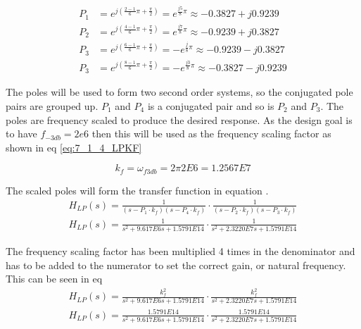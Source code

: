 \begin{equation}\label{eq:7_1_4_LPPoles1} 
    \begin{aligned}
        P_1 &= e^{j\left(\frac{2-1}{6}\pi + \frac{\pi}{2}\right)} = e^{\frac{j5}{8}\pi} \approx -0.3827 + j0.9239 \\
        P_2 &= e^{j\left(\frac{4-1}{6}\pi + \frac{\pi}{2}\right)} = e^{\frac{j7}{8}\pi} \approx -0.9239 + j0.3827 \\
        P_3 &= e^{j\left(\frac{6-1}{6}\pi + \frac{\pi}{2}\right)} = -e^{\frac{j}{8}\pi} \approx -0.9239 - j0.3827  \\
        P_3 &= e^{j\left(\frac{8-1}{6}\pi + \frac{\pi}{2}\right)} = -e^{\frac{j3}{8}\pi}\approx -0.3827 - j0.9239 
    \end{aligned}
\end{equation}

The poles will be used to form two second order systems, so the conjugated pole pairs are grouped up. $P_1$ and $P_4$ is a conjugated pair and so is $P_2$ and $P_3$. The poles are frequency scaled to produce the desired response. As the design goal is to have $f_{-3db} = 2e6$ then this will be used as the frequency scaling factor as shown in eq \ref{eq:7_1_4_LPKF}

\begin{equation}\label{eq:7_1_4_LPKF}
    k_f = \omega_{f3db} = 2\pi 2E6 = 1.2567E7
\end{equation}

The scaled poles will form the transfer function in equation .
\begin{equation}\label{eq:7_1_4_LPTF}
    \begin{aligned}
    H_{LP}(s) = \frac{1}{(s-P_1\cdot k_f)(s-P_4\cdot k_f)  }\cdot \frac{1}{(s-P_2\cdot k_f)(s-P_3\cdot k_f)}\\
    H_{LP}(s) = \frac{1}{s^2 + 9.617E6s + 1.5791E14}\cdot \frac{1}{s^2 + 2.3220E7s + 1.5791E14}
\end{aligned}
\end{equation}

The frequency scaling factor has been multiplied 4 times in the denominator and has to be added to the numerator to set the correct gain, or natural frequency. This can be seen in eq 
\begin{equation}\label{eq:7_1_4_LPTFKFSQ}
    \begin{aligned}
        H_{LP}(s) = \frac{k_f^2}{s^2 + 9.617E6s + 1.5791E14}\cdot \frac{k_f^2}{s^2 + 2.3220E7s + 1.5791E14}\\
    H_{LP}(s) = \frac{1.5791E14}{s^2 + 9.617E6s + 1.5791E14}\cdot \frac{1.5791E14}{s^2 + 2.3220E7s + 1.5791E14}
\end{aligned}
\end{equation}

